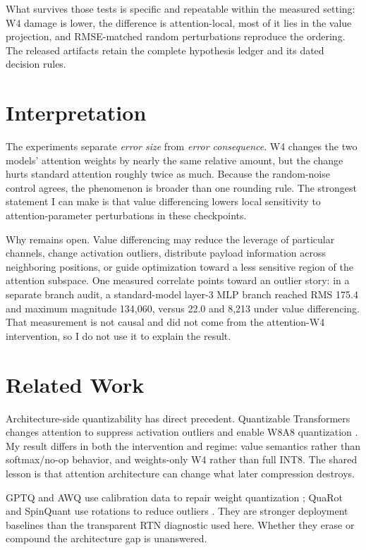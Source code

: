 \documentclass[10pt]{article}
\begin{document}
What survives those tests is specific and repeatable within the measured setting: W4 damage is lower, the difference is attention-local, most of it lies in the value projection, and RMSE-matched random perturbations reproduce the ordering. The released artifacts retain the complete hypothesis ledger and its dated decision rules.

\section{Interpretation}\label{interpretation}

The experiments separate \emph{error size} from \emph{error consequence}. W4 changes the two models' attention weights by nearly the same relative amount, but the change hurts standard attention roughly twice as much. Because the random-noise control agrees, the phenomenon is broader than one rounding rule. The strongest statement I can make is that value differencing lowers local sensitivity to attention-parameter perturbations in these checkpoints.

Why remains open. Value differencing may reduce the leverage of particular channels, change activation outliers, distribute payload information across neighboring positions, or guide optimization toward a less sensitive region of the attention subspace. One measured correlate points toward an outlier story: in a separate branch audit, a standard-model layer-3 MLP branch reached RMS 175.4 and maximum magnitude 134,060, versus 22.0 and 8,213 under value differencing. That measurement is not causal and did not come from the attention-W4 intervention, so I do not use it to explain the result.

\section{Related Work}\label{related-work}

Architecture-side quantizability has direct precedent. Quantizable Transformers changes attention to suppress activation outliers and enable W8A8 quantization \citep{bondarenko2023quantizable}. My result differs in both the intervention and regime: value semantics rather than softmax/no-op behavior, and weights-only W4 rather than full INT8. The shared lesson is that attention architecture can change what later compression destroys.

GPTQ and AWQ use calibration data to repair weight quantization \citep{frantar2022gptq,lin2024awq}; QuaRot and SpinQuant use rotations to reduce outliers \citep{ashkboos2024quarot,liu2024spinquant}. They are stronger deployment baselines than the transparent RTN diagnostic used here. Whether they erase or compound the architecture gap is unanswered.
\end{document}
